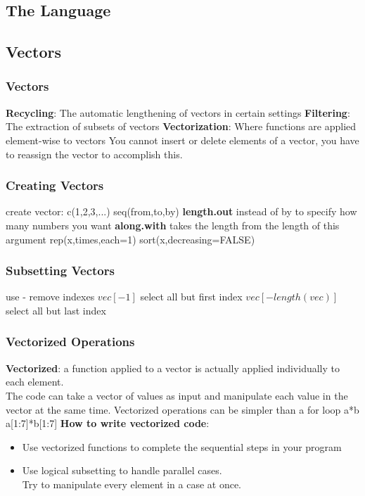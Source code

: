 \documentclass[openany]{book}
\begin{document}
\begin{flushleft}
\part{The Language}
\chapter{Vectors}
\section{Vectors}
\textbf{Recycling}: The automatic lengthening of vectors in certain settings \medbreak
\textbf{Filtering}: The extraction of subsets of vectors \medbreak
\textbf{Vectorization}: Where functions are applied element-wise to vectors \medbreak
You cannot insert or delete elements of a vector, you have to reassign the vector to accomplish this.
\section{Creating Vectors}
create vector: c(1,2,3,...) \medbreak
seq(from,to,by) \medbreak
\textbf{length.out} instead of by to specify how many numbers you want \medbreak
\textbf{along.with} takes the length from the length of this argument \medbreak
rep(x,times,each=1) \medbreak
sort(x,decreasing=FALSE)\medbreak
\section{Subsetting Vectors}
use - remove indexes \medbreak
$vec[-1]$ select all but first index \medbreak
$vec[-length(vec)]$ select all but last index
\section{Vectorized Operations}
\textbf{Vectorized}: a function applied to a vector is actually applied individually to each element.\\
The code can take a vector of values as input and manipulate each value in the vector at the same time.  \medbreak
Vectorized operations can be simpler than a for loop \medbreak
a*b\\
a[1:7]*b[1:7] \medbreak
\textbf{How to write vectorized code}:
\begin{itemize}
	\item Use vectorized functions to complete the sequential steps in your program
	\item Use logical subsetting to handle parallel cases.\\
	Try to manipulate every element in a case at once.
\end{itemize}


\end{flushleft}
\end{document}
